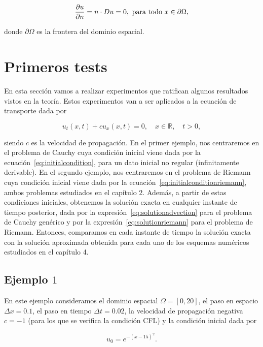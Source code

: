 \begin{equation*}
    \diffp{u}{n}=
    n\cdot Du=
    0,\text{ para todo }x\in\partial\Omega,
\end{equation*}

donde $\partial\Omega$ es la frontera del dominio espacial.

\section{Primeros tests}

En esta sección vamos a realizar experimentos que ratifican algunos
resultados vistos en la teoría.
Estos experimentos van a ser aplicados a la ecuación de transporte
dada por

\begin{equation}\label{eq:transportequation}
    u_{t}
    \left(x,t\right)+
    cu_{x}
    \left(x,t\right)=
    0,\quad
    x\in\mathbb{R},\quad
    t>0,
\end{equation}

siendo $c$ es la velocidad de propagación.
En el primer ejemplo, nos centraremos en el problema de Cauchy cuya
condición inicial viene dada por la
ecuación~\eqref{eq:initialcondition}, para un dato inicial no regular
(infinitamente derivable).
En el segundo ejemplo, nos centraremos en el problema de Riemann cuya
condición inicial viene dada por la
ecuación~\eqref{eq:initialconditionriemann}, ambos problemas
estudiados en el capítulo 2.
Además, a partir de estas condiciones iniciales, obtenemos la
solución exacta en cualquier instante de tiempo posterior, dada por
la expresión~\eqref{eq:solutionadvection} para el problema de Cauchy
genérico y por la expresión~\eqref{eq:solutionriemann} para el
problema de Riemann.
Entonces, comparamos en cada instante de tiempo la solución exacta
con la solución aproximada obtenida para cada uno de los esquemas
numéricos estudiados en el capítulo 4.

\subsection*{Ejemplo $1$}

En este ejemplo consideramos el dominio espacial
$\Omega=\left[0,20\right]$, el paso en espacio $\Delta x=0.1$, el
paso en tiempo $\Delta t=0.02$, la velocidad de propagación negativa
$c=-1$ (para los que se verifica la condición CFL) y la condición
inicial dada por

\begin{equation*}
    u_{0}=
    e^{-{\left(x-15\right)}^{2}}.
\end{equation*}

